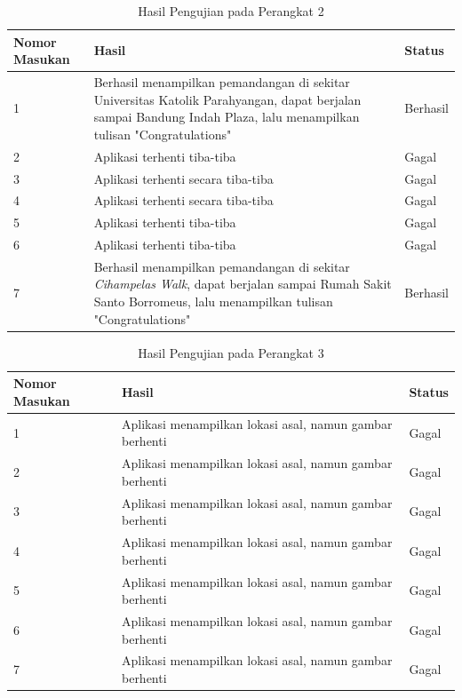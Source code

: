 \begin{table}[]
    \centering
    \caption{Hasil Pengujian pada Perangkat 2}
    \begin{tabular}{|p{3cm}||p{4cm}|p{4cm}|}
    \hline
       Nomor Masukan & Hasil & Status \\
    \hline \hline
        1 & Berhasil menampilkan pemandangan di sekitar Universitas Katolik Parahyangan, dapat berjalan sampai Bandung Indah Plaza, lalu menampilkan tulisan "Congratulations" & Berhasil\\
    \hline
        2 & Aplikasi terhenti tiba-tiba & Gagal \\
    \hline
        3 & Aplikasi terhenti secara tiba-tiba & Gagal \\
        \hline
        4 & Aplikasi terhenti secara tiba-tiba & Gagal \\
        \hline
        5 & Aplikasi terhenti tiba-tiba & Gagal \\
        \hline
        6 & Aplikasi terhenti tiba-tiba & Gagal \\
        \hline 
        7 & Berhasil menampilkan pemandangan di sekitar \textit{Cihampelas Walk}, dapat berjalan sampai Rumah Sakit Santo Borromeus, lalu menampilkan tulisan "Congratulations" & Berhasil\\
        \hline
    \end{tabular}
    \label{tab:test-hardware-two}
\end{table} 

\begin{table}[]
    \centering
    \caption{Hasil Pengujian pada Perangkat 3}
    \begin{tabular}{|p{3cm}||p{4cm}|p{4cm}|}
    \hline
       Nomor Masukan & Hasil & Status \\
    \hline \hline
        1 & Aplikasi menampilkan lokasi asal, namun gambar berhenti & Gagal\\
    \hline
        2 & Aplikasi menampilkan lokasi asal, namun gambar berhenti & Gagal \\
    \hline
        3 & Aplikasi menampilkan lokasi asal, namun gambar berhenti & Gagal \\
        \hline
        4 & Aplikasi menampilkan lokasi asal, namun gambar berhenti & Gagal \\
        \hline
        5 & Aplikasi menampilkan lokasi asal, namun gambar berhenti & Gagal \\
        \hline
        6 & Aplikasi menampilkan lokasi asal, namun gambar berhenti & Gagal \\
        \hline
        7 & Aplikasi menampilkan lokasi asal, namun gambar berhenti & Gagal \\ 
        \hline
    \end{tabular}
    \label{tab:test-hardware-three}
\end{table}

